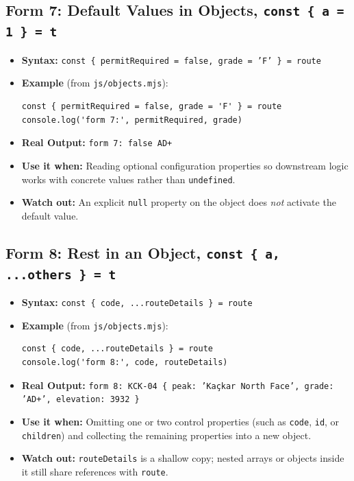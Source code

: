 \documentclass[11pt, a4paper]{article}
\begin{document}
\subsection{Form 7: Default Values in Objects, \texttt{const \{ a = 1 \} = t}}
\begin{itemize}
  \item \textbf{Syntax:} \texttt{const \{ permitRequired = false, grade = 'F' \} = route}
  \item \textbf{Example} (from \texttt{js/objects.mjs}):
\begin{lstlisting}
const { permitRequired = false, grade = 'F' } = route
console.log('form 7:', permitRequired, grade)
\end{lstlisting}
  \item \textbf{Real Output:} \texttt{form 7: false AD+}
  \item \textbf{Use it when:} Reading optional configuration properties so downstream logic works with concrete values rather than \texttt{undefined}.
  \item \textbf{Watch out:} An explicit \texttt{null} property on the object does \emph{not} activate the default value.
\end{itemize}

\subsection{Form 8: Rest in an Object, \texttt{const \{ a, ...others \} = t}}
\begin{itemize}
  \item \textbf{Syntax:} \texttt{const \{ code, ...routeDetails \} = route}
  \item \textbf{Example} (from \texttt{js/objects.mjs}):
\begin{lstlisting}
const { code, ...routeDetails } = route
console.log('form 8:', code, routeDetails)
\end{lstlisting}
  \item \textbf{Real Output:} \texttt{form 8: KCK-04 \{ peak: 'Kaçkar North Face', grade: 'AD+', elevation: 3932 \}}
  \item \textbf{Use it when:} Omitting one or two control properties (such as \texttt{code}, \texttt{id}, or \texttt{children}) and collecting the remaining properties into a new object.
  \item \textbf{Watch out:} \texttt{routeDetails} is a shallow copy; nested arrays or objects inside it still share references with \texttt{route}.
\end{itemize}
\end{document}
